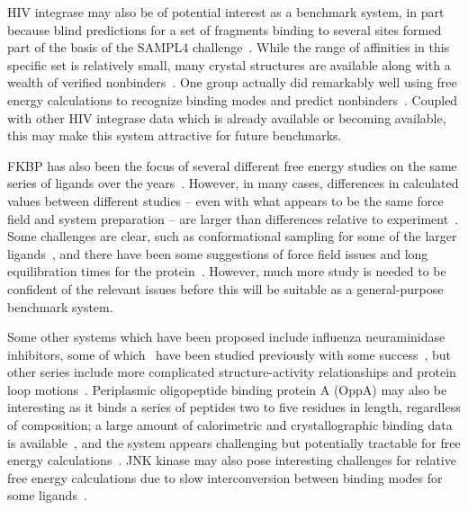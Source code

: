 \documentclass[aps,pre,twocolumn,nofootinbib,superscriptaddress,10pt, final,tightenlines]{revtex4-1}
\begin{document}
HIV integrase may also be of potential interest as a benchmark system, in part because blind predictions for a set of fragments binding to several sites formed part of the basis of the SAMPL4 challenge~\cite{mobley_blind_2014, peat_interrogating_2014}. 
While the range of affinities in this specific set is relatively small, many crystal structures are available along with a wealth of verified nonbinders~\cite{peat_interrogating_2014}. 
One group actually did remarkably well using free energy calculations to recognize binding modes and predict nonbinders~\cite{gallicchio_virtual_2014, mobley_blind_2014}. 
Coupled with other HIV integrase data which is already available or becoming available, this may make this system attractive for future benchmarks.

FKBP has also been the focus of several different free energy studies on the same series of ligands over the years~\cite{shirts_calculating_2004, fujitani_direct_2005, jayachandran_parallelized-over-parts_2006, lee_calculation_2006, wang_absolute_2006, fujitani_massively_2009, ytreberg_absolute_2009}. 
However, in many cases, differences in calculated values between different studies -- even with what appears to be the same force field and system preparation -- are larger than differences relative to experiment~\cite{fujitani_direct_2005, jayachandran_parallelized-over-parts_2006}. 
Some challenges are clear, such as conformational sampling for some of the larger ligands~\cite{shirts_calculating_2004}, and there have been some suggestions of force field issues and long equilibration times for the protein~\cite{fujitani_massively_2009}. 
However, much more study is needed to be confident of the relevant issues before this will be suitable as a general-purpose benchmark system.

Some other systems which have been proposed include influenza neuraminidase inhibitors, some of which~\cite{smith_dihydropyrancarboxamides_1998} have been studied previously with some success~\cite{michel_protein_2006}, but other series include more complicated structure-activity relationships and protein loop motions~\cite{kerry_structural_2013}. 
Periplasmic oligopeptide binding protein A (OppA) may also be interesting as it binds a series of peptides two to five residues in length, regardless of composition; a large amount of calorimetric and crystallographic binding data is available~\cite{tame_crystal_1995, davies_relating_1999, sleigh_crystallographic_1999}, and the system appears challenging but potentially tractable for free energy calculations~\cite{maurer_calculation_2016}. 
JNK kinase may also pose interesting challenges for relative free energy calculations due to slow interconversion between binding modes for some ligands~\cite{kaus_how_2015}.
\end{document}
